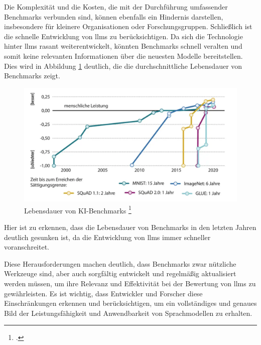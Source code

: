 Die Komplexität und die Kosten, die mit der Durchführung umfassender Benchmarks verbunden sind, können ebenfalls ein Hindernis darstellen, insbesondere für kleinere Organisationen oder Forschungsgruppen. Schließlich ist die schnelle Entwicklung von \acp{llm} zu berücksichtigen. Da sich die Technologie hinter \acp{llm} rasant weiterentwickelt, könnten Benchmarks schnell veralten und somit keine relevanten Informationen über die neuesten Modelle bereitstellen.
Dies wird in Abbildung \ref{fig:benchmarks} deutlich, die die durchschnittliche Lebensdauer von Benchmarks zeigt.

\begin{figure}
    \centering
    \includegraphics[width=\textwidth]{Grafiken/Lebensdauer von KI-Benchmarks.png}
    \caption{Lebensdauer von KI-Benchmarks \footcite[][S. 4]{Heise:KI}}
    \label{fig:benchmarks}
\end{figure}

Hier ist zu erkennen, dass die Lebensdauer von Benchmarks in den letzten Jahren deutlich gesunken ist, da die Entwicklung von \acp{llm} immer schneller voranschreitet.

Diese Herausforderungen machen deutlich, dass Benchmarks zwar nützliche Werkzeuge sind, aber auch sorgfältig entwickelt und regelmäßig aktualisiert werden müssen, um ihre Relevanz und Effektivität bei der Bewertung von \acp{llm} zu gewährleisten. Es ist wichtig, dass Entwickler und Forscher diese Einschränkungen erkennen und berücksichtigen, um ein vollständiges und genaues Bild der Leistungsfähigkeit und Anwendbarkeit von Sprachmodellen zu erhalten.

